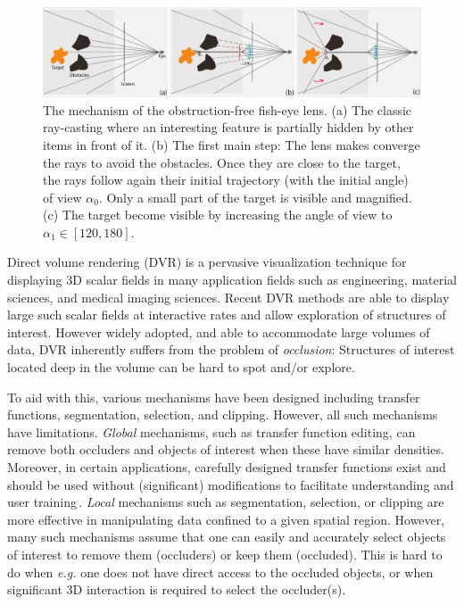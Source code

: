 \begin{figure} 
\includegraphics [width=\textwidth]{images/principle.pdf} 
\caption{The mechanism of the obstruction-free fish-eye lens. (a) The classic ray-casting where an interesting feature is partially hidden by other items in front of it. (b) The first main step: The lens makes converge the rays to avoid the obstacles. Once they are close to the target, the rays follow again their initial trajectory (with the initial angle) of view $\alpha_0$. Only a small part of the target is visible and magnified. (c) The target become visible by increasing the angle of view to $\alpha_1 \in \left[120,180\right]$.   }
\label{f:fisheye}
\end{figure}


Direct volume rendering (DVR) is a pervasive visualization technique for displaying 3D scalar fields in many application fields such as engineering, material sciences, and medical imaging sciences. Recent DVR methods are able to display large such scalar fields at interactive rates and allow exploration of structures of interest. However widely adopted, and able to accommodate large volumes of data, DVR inherently suffers from the problem of \emph{occlusion}: Structures of interest located deep in the volume can be hard to spot and/or explore.

To aid with this, various mechanisms have been designed including transfer functions, segmentation, selection, and clipping. However, all such mechanisms have limitations.  \emph{Global} mechanisms, such as transfer function editing, can remove both occluders and objects of interest when these have similar densities. Moreover, in certain applications, carefully designed transfer functions exist and should be used without (significant) modifications to facilitate understanding and user training\,\cite{xxx}. \emph{Local} mechanisms such as segmentation, selection, or clipping are more effective in manipulating data confined to a given spatial region. However, many such mechanisms assume that one can easily and accurately select objects of interest to remove them (occluders) or keep them (occluded). This is hard to do when \emph{e.g.} one does not have direct access to the occluded objects, or when significant 3D interaction is required to select the occluder(s).


